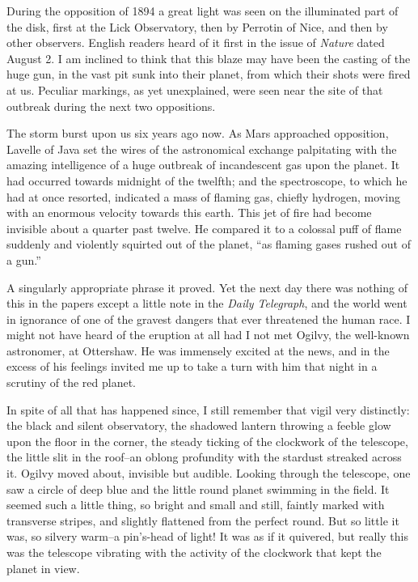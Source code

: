 During the opposition of 1894 a great light was seen on the
illuminated part of the disk, first at the Lick Observatory, then
by Perrotin of Nice, and then by other observers. English readers
heard of it first in the issue of \emph{Nature} dated August 2. I
am inclined to think that this blaze may have been the casting of
the huge gun, in the vast pit sunk into their planet, from which
their shots were fired at us. Peculiar markings, as yet
unexplained, were seen near the site of that outbreak during the
next two oppositions.

The storm burst upon us six years ago now. As Mars approached
opposition, Lavelle of Java set the wires of the astronomical
exchange palpitating with the amazing intelligence of a huge
outbreak of incandescent gas upon the planet. It had occurred
towards midnight of the twelfth; and the spectroscope, to which he
had at once resorted, indicated a mass of flaming gas, chiefly
hydrogen, moving with an enormous velocity towards this earth. This
jet of fire had become invisible about a quarter past twelve. He
compared it to a colossal puff of flame suddenly and violently
squirted out of the planet, ``as flaming gases rushed out of a
gun.''

A singularly appropriate phrase it proved. Yet the next day there
was nothing of this in the papers except a little note in the
\emph{Daily Telegraph}, and the world went in ignorance of one of
the gravest dangers that ever threatened the human race. I might
not have heard of the eruption at all had I not met Ogilvy, the
well-known astronomer, at Ottershaw. He was immensely excited at
the news, and in the excess of his feelings invited me up to take a
turn with him that night in a scrutiny of the red planet.

In spite of all that has happened since, I still remember that
vigil very distinctly: the black and silent observatory, the
shadowed lantern throwing a feeble glow upon the floor in the
corner, the steady ticking of the clockwork of the telescope, the
little slit in the roof--an oblong profundity with the stardust
streaked across it. Ogilvy moved about, invisible but audible.
Looking through the telescope, one saw a circle of deep blue and
the little round planet swimming in the field. It seemed such a
little thing, so bright and small and still, faintly marked with
transverse stripes, and slightly flattened from the perfect round.
But so little it was, so silvery warm--a pin's-head of light! It
was as if it quivered, but really this was the telescope vibrating
with the activity of the clockwork that kept the planet in view.

